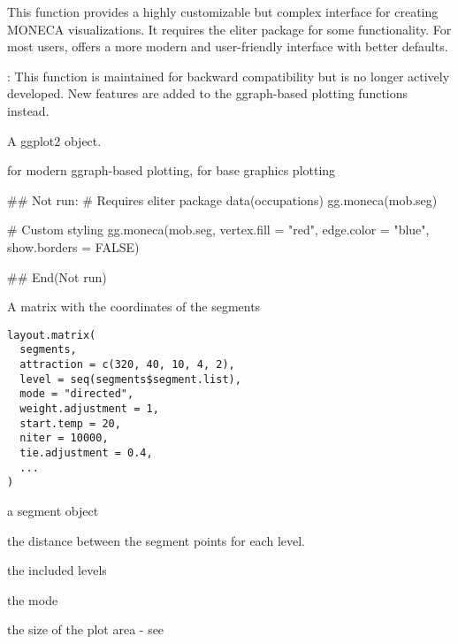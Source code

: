 \documentclass[a4paper]{book}
\begin{document}
%
\begin{Details}
This function provides a highly customizable but complex interface for creating
MONECA visualizations. It requires the eliter package for some functionality.
For most users,  offers a more modern and
user-friendly interface with better defaults.

: This function is maintained for backward compatibility but
is no longer actively developed. New features are added to the ggraph-based
plotting functions instead.
\end{Details}
%
\begin{Value}
A ggplot2 object.
\end{Value}
%
\begin{SeeAlso}
 for modern ggraph-based plotting,
 for base graphics plotting
\end{SeeAlso}
%
\begin{Examples}
\begin{ExampleCode}
## Not run: 
# Requires eliter package
data(occupations)
gg.moneca(mob.seg)

# Custom styling
gg.moneca(mob.seg, 
         vertex.fill = "red",
         edge.color = "blue",
         show.borders = FALSE)

## End(Not run)

\end{ExampleCode}
\end{Examples}
%
\begin{Description}
A matrix with the coordinates of the segments
\end{Description}
%
\begin{Usage}
\begin{verbatim}
layout.matrix(
  segments,
  attraction = c(320, 40, 10, 4, 2),
  level = seq(segments$segment.list),
  mode = "directed",
  weight.adjustment = 1,
  start.temp = 20,
  niter = 10000,
  tie.adjustment = 0.4,
  ...
)
\end{verbatim}
\end{Usage}
%
\begin{Arguments}
\begin{ldescription}
\item[\code{segments}] a segment object

\item[\code{attraction}] the distance between the segment points for each level.

\item[\code{level}] the included levels

\item[\code{mode}] the mode

\item[\code{area.size}] the size of the plot area - see 
\end{ldescription}
\end{Arguments}
\end{document}
